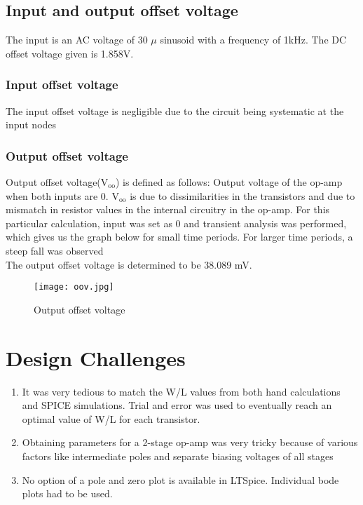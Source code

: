 \documentclass[titlepage]{article}
\begin{document}
\subsection{Input and output offset voltage}
The input is an AC voltage of 30 $\mu$ sinusoid with a frequency of 1kHz. The DC offset voltage given is 1.858V.
\subsubsection{Input offset voltage}
The input offset voltage is negligible due to the circuit being systematic at the input nodes
\newpage
\subsubsection{Output offset voltage}
Output offset voltage($\text{V}_{\text{oo}}$) is defined as follows: Output voltage of the op-amp when both inputs are 0. $\text{V}_{\text{oo}}$ is due to dissimilarities in the transistors and due to mismatch in resistor values in the internal circuitry in the op-amp.
For this particular calculation, input was set as 0 and transient analysis was performed, which gives us the graph below for small time periods. For larger time periods, a steep fall was observed \\[2ex]
The output offset voltage is determined to be 38.089 mV.
\begin{figure}[ht]
    \centering
    \texttt{[image: oov.jpg]}
    \caption{Output offset voltage}
    \label{fig:offset}
\end{figure}
\section{Design Challenges}
\begin{enumerate}
    \item It was very tedious to match the W/L values from both hand calculations and SPICE simulations. Trial and error was used to eventually reach an optimal value of W/L for each transistor.
    \item Obtaining parameters for a 2-stage op-amp was very tricky because of various factors like intermediate poles and separate biasing voltages of all stages
    \item No option of a pole and zero plot is available in LTSpice. Individual bode plots had to be used.
\end{enumerate}
\end{document}
